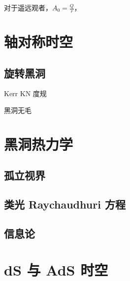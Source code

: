 对于遥远观者，$A_{0} = \frac{Q}{r}$，

\section{轴对称时空}
    \subsection{旋转黑洞}
Kerr 
    KN 度规

黑洞无毛

\section{黑洞热力学}
\subsection{孤立视界}
\subsection{类光 Raychaudhuri 方程}
\subsection{信息论}

\section{dS 与 AdS 时空}\label{sec:dS}
